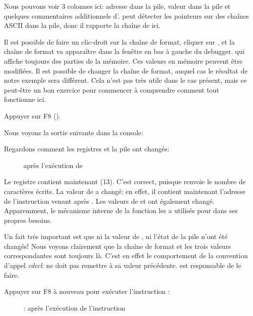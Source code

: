 Nous pouvons voir 3 colonnes ici: adresse dans la pile, valeur dans la pile et quelques
commentaires additionnels d'\olly.
\olly peut détecter les pointeurs sur des chaînes ASCII dans la pile, donc il
rapporte la chaîne de \printf{} ici.

Il est possible de faire un clic-droit sur la chaîne de format, cliquer sur ,
et la chaîne de format va apparaître dans la fenêtre en bas à gauche du debugger. qui affiche
toujours des parties de la mémoire.
Ces valeurs en mémoire peuvent être modifiées.
Il est possible de changer la chaîne de format, auquel cas le résultat de notre
exemple sera différent.
Cela n'est pas très utile dans le cas présent, mais ce peut-être un bon exercice
pour commencer à comprendre comment tout fonctionne ici.

\clearpage
Appuyer sur F8 (\stepover).

Nous voyons la sortie suivante dans la console:



Regardons comment les registres et la pile ont changés:

\begin{figure}[H]
\centering
{}
\caption{\olly après l'exécution de \printf{}}
\label{fig:printf3_olly_3}
\end{figure}

Le registre \EAX contient maintenant  (13).
C'est correct, puisque \printf renvoie le nombre de caractères écrits.
La valeur de \EIP a changé: en effet, il contient maintenant l'adresse de l'instruction
venant après
.
Les valeurs de \ECX et \EDX ont également changé.
Apparemment, le mécanisme interne de la fonction \printf les a utilisés pour dans
ses propres besoins.

Un fait très important est que ni la valeur de \ESP, ni l'état de la pile n'ont
été changés!
Nous voyons clairement que la chaîne de format et les trois valeurs correspondantes
sont toujours là.
C'est en effet le comportement de la convention d'appel \emph{cdecl}: 
ne doit pas remettre \ESP à sa valeur précédente.
 est responsable de le faire.

\clearpage
Appuyer sur F8 à nouveau pour exécuter l'instruction :

\begin{figure}[H]
\centering
{}
\caption{\olly: après l'exécution de l'instruction }
\label{fig:printf3_olly_4}
\end{figure}

